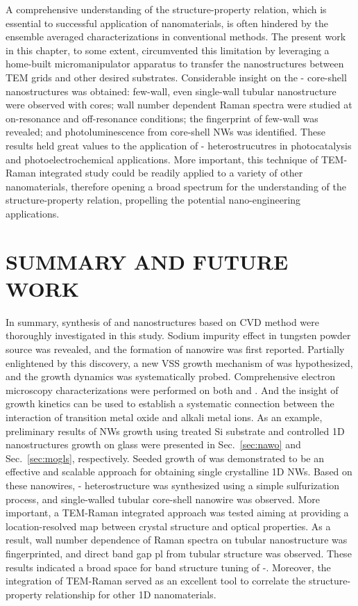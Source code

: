A comprehensive understanding of the structure-property relation, which is essential to successful application of nanomaterials, is often hindered by the ensemble averaged characterizations in conventional methods. The present work in this chapter, to some extent, circumvented this limitation by leveraging a home-built micromanipulator apparatus to transfer the nanostructures between TEM grids and other desired substrates. Considerable insight on the - core-shell nanostructures was obtained: few-wall, even single-wall tubular  nanostructure were observed with  cores; wall number dependent Raman spectra were studied at on-resonance and off-resonance conditions; the fingerprint of few-wall  was revealed; and photoluminescence from core-shell NWs was identified. These results held great values to the application of - heterostrucutres in photocatalysis and photoelectrochemical applications. More important, this technique of TEM-Raman integrated study could be readily applied to a variety of other nanomaterials, therefore opening a broad spectrum for the understanding of the structure-property relation, propelling the potential nano-engineering applications. 

\chapter{SUMMARY AND FUTURE WORK}

In summary, synthesis of  and  nanostructures based on CVD method were thoroughly investigated in this study. Sodium impurity effect in tungsten powder source was revealed, and the formation of  nanowire was first reported. Partially enlightened by this discovery, a new VSS growth mechanism of  was hypothesized, and the growth dynamics was systematically probed. Comprehensive electron microscopy characterizations were performed on both  and . And the insight of growth kinetics can be used to establish a systematic connection between the interaction of transition metal oxide and alkali metal ions. As an example, preliminary results of  NWs growth using  treated Si substrate and controlled  1D nanostructures growth on glass were presented in Sec.~\ref{sec:nawo} and Sec.~\ref{sec:mogls}, respectively. Seeded growth of  was demonstrated to be an effective and scalable approach for obtaining single crystalline 1D  NWs. Based on these  nanowires, - heterostructure was synthesized using a simple sulfurization process, and single-walled  tubular core-shell nanowire was observed. More important, a TEM-Raman integrated approach was tested aiming at providing a location-resolved map between crystal structure and optical properties. As a result, wall number dependence of Raman spectra on  tubular nanostructure was fingerprinted, and direct band gap \gls{pl} from  tubular structure was observed. These results indicated a broad space for band structure tuning of -. Moreover, the integration of TEM-Raman served as an excellent tool to correlate the structure-property relationship for other 1D nanomaterials.

